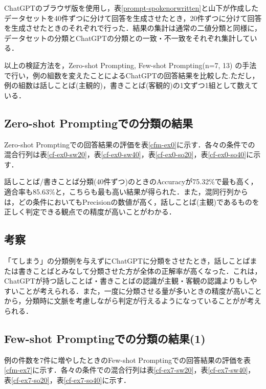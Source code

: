 ChatGPTのブラウザ版を使用し，表\ref{prompt-spokenorwritten}と山下が作成したデータセットを40件ずつに分けて回答を生成させたとき，20件ずつに分けて回答を生成させたときのそれぞれで行った．結果の集計は通常の二値分類と同様に，データセットの分類とChatGPTの分類との一致・不一致をそれぞれ集計している．

以上の検証方法を，Zero-shot Prompting, Few-shot Prompting(n=7, 13) の手法で行い，例の組数を変えたことによるChatGPTの回答結果を比較した.ただし，例の組数は話しことば(主観的)，書きことば(客観的)の1文ずつ1組として数えている．

\subsection{Zero-shot Promptingでの分類の結果 \label{c6s1-1}}

Zero-shot Promptingでの回答結果の評価を表\ref{cfm-ex0}に示す．各々の条件での混合行列は表\ref{cf-ex0-sw20}，表\ref{cf-ex0-sw40}，表\ref{cf-ex0-so20}，表\ref{cf-ex0-so40}に示す．







話しことば/書きことば分類(40件ずつ)のときのAccuracyが75.32\%で最も高く，適合率も85.63\%と，こちらも最も高い結果が得られた．また，混同行列からは，どの条件においてもPrecisionの数値が高く，話しことば(主観)であるものを正しく判定できる観点での精度が高いことがわかる．

\subsection{考察}
「てしまう」の分類例を与えずにChatGPTに分類をさせたとき，話しことばまたは書きことばとみなして分類させた方が全体の正解率が高くなった．これは，ChatGPTが持つ話しことば・書きことばの認識が主観・客観の認識よりもしやすいことが考えられる．また，一度に分類させる量が多いときの精度が高いことから，分類時に文脈を考慮しながら判定が行えるようになっていることがが考えられる．

\subsection{Few-shot Promptingでの分類の結果(1) \label{c6s1-2}}
例の件数を7件に増やしたときのFew-shot Promptingでの回答結果の評価を表\ref{cfm-ex7}に示す．各々の条件での混合行列は表\ref{cf-ex7-sw20}，表\ref{cf-ex7-sw40}，表\ref{cf-ex7-so20}，表\ref{cf-ex7-so40}に示す．

